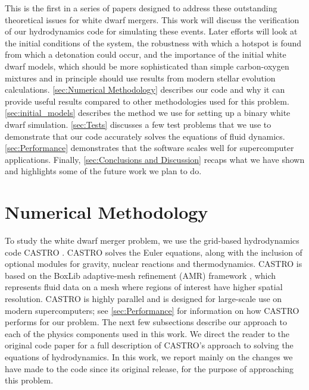 \documentclass[iop]{../emulateapj}
\begin{document}
This is the first in a series of papers designed to address these
outstanding theoretical issues for white dwarf mergers. This work will
discuss the verification of our hydrodynamics code for simulating
these events. Later efforts will look at the initial conditions of the
system, the robustness with which a hotspot is found from which a
detonation could occur, and the importance of the initial white dwarf
models, which should be more sophisticated than simple carbon-oxygen
mixtures and in principle should use results from modern stellar
evolution calculations. \autoref{sec:Numerical Methodology}
describes our code and why it can provide useful results compared to
other methodologies used for this problem. 
\autoref{sec:initial_models} describes the method we use for setting up a
binary white dwarf simulation. \autoref{sec:Tests} discusses a few
test problems that we use to demonstrate that our code accurately
solves the equations of fluid dynamics. \autoref{sec:Performance}
demonstrates that the software scales well for supercomputer
applications. Finally, \autoref{sec:Conclusions and Discussion}
recaps what we have shown and highlights some of the future work we
plan to do.

\section{Numerical Methodology}\label{sec:Numerical Methodology}

To study the white dwarf merger problem, we use the grid-based
hydrodynamics code CASTRO \citep{castro}. CASTRO solves the Euler
equations, along with the inclusion of optional modules for gravity,
nuclear reactions and thermodynamics. CASTRO is based on the BoxLib
adaptive-mesh refinement (AMR) framework \citep{rendleman:2000}, which
represents fluid data on a mesh where regions of interest have higher
spatial resolution. CASTRO is highly parallel and is designed for
large-scale use on modern supercomputers; see 
\autoref{sec:Performance} for information on how CASTRO performs for our
problem. The next few subsections describe our approach to each of the
physics components used in this work. We direct the reader to the
original code paper for a full description of CASTRO's approach to
solving the equations of hydrodynamics. In this work, we report mainly
on the changes we have made to the code since its original release,
for the purpose of approaching this problem.
\end{document}
